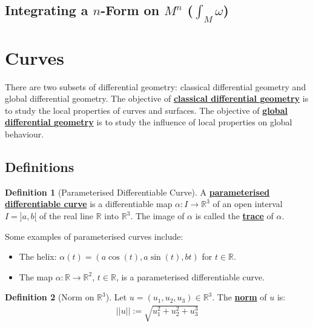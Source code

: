 \documentclass[11pt]{scrartcl}
\newcommand{\R}[0]{\mathbb{R}}
\theoremstyle{definition}
\newtheorem{definition}{Definition}
\theoremstyle{remark}
\newcommand{\dfn}[1]{\textbf{\underline{#1}}}
\newcommand{\idx}[2]{\int_{#1}^{#2}}
\begin{document}
{\subsection{Integrating a $n$-Form on $M^n$ ($\idx{M}{} \omega$)} 

\section{Curves}
There are two subsets of differential geometry: classical differential geometry and global differential geometry. The objective of \dfn{classical differential geometry} is to study the local properties of curves and surfaces. The objective of \dfn{global differential geometry} is to study the influence of local properties on global behaviour. 
\subsection{Definitions}

\begin{definition}[Parameterised Differentiable Curve] 
	A \dfn{parameterised differentiable curve} is a differentiable map $ \alpha: I \rightarrow \R^3$ of an open interval $I = ]a,b[$ of the real line $\R$ into $\R^3$. The image of $\alpha$ is called the \dfn{trace} of $\alpha$. 
\end{definition}

Some examples of parameterised curves include: 
\begin{itemize}[noitemsep]
	\item The helix: $\alpha(t) = (a \cos (t), a \sin(t), bt)$ for $t \in \R$. 
	\item The map $\alpha: \R \rightarrow \R^2$, $t \in \R$, is a parameterised differentiable curve. 
\end{itemize}

\begin{definition}[Norm on $\R^3$]
	Let $u = (u_1, u_2, u_3) \in \R^3$. The \dfn{norm} of $u$ is: 
	\begin{align*}
		|| u || := \sqrt{ u_1^2 + u_2^2 + u_3^3} 
	\end{align*}
\end{definition}

}
\end{document}
